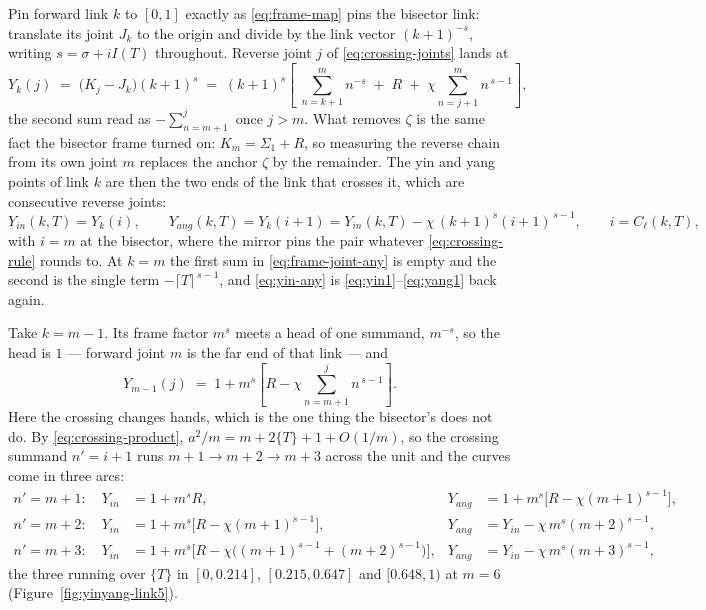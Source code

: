 \documentclass[11pt]{article}
\theoremstyle{definition}
\begin{document}
Pin forward link $k$ to $[0,1]$ exactly as \eqref{eq:frame-map} pins the
bisector link: translate its joint $J_k$ to the origin and divide by the link
vector $(k+1)^{-s}$, writing $s=\sigma+iI(T)$ throughout. Reverse joint $j$ of
\eqref{eq:crossing-joints} lands at
\begin{equation}\label{eq:frame-joint-any}
Y_k(j)\;=\;\bigl(K_j-J_k\bigr)(k+1)^{s}
\;=\;(k+1)^{s}\left[\;\sum_{n=k+1}^{m}n^{-s}\;+\;R\;+\;\chi\!\!\sum_{n=j+1}^{m}\!\!n^{\,s-1}\right],
\end{equation}
the second sum read as $-\sum_{n=m+1}^{j}$ once $j>m$. What removes $\zeta$ is
the same fact the bisector frame turned on: $K_m=\Sigma_1+R$, so measuring the
reverse chain from its own joint $m$ replaces the anchor $\zeta$ by the
remainder. The yin and yang points of link $k$ are then the two ends of the
link that crosses it, which are consecutive reverse joints:
\begin{equation}\label{eq:yin-any}
Y_{in}(k,T)=Y_k(i),
\qquad
Y_{ang}(k,T)=Y_k(i+1)=Y_{in}(k,T)-\chi\,(k+1)^{s}(i+1)^{\,s-1},
\qquad i=C_{\ell}(k,T),
\end{equation}
with $i=m$ at the bisector, where the mirror pins the pair whatever
\eqref{eq:crossing-rule} rounds to. At $k=m$ the first sum in
\eqref{eq:frame-joint-any} is empty and the second is the single term
$-\lceil T\rceil^{\,s-1}$, and \eqref{eq:yin-any} is
\eqref{eq:yin1}--\eqref{eq:yang1} back again.

Take $k=m-1$. Its frame factor $m^{s}$ meets a head of one summand, $m^{-s}$,
so the head is $1$ — forward joint $m$ is the far end of that link — and
\begin{equation}\label{eq:frame-joint-below}
Y_{m-1}(j)\;=\;1+m^{s}\left[R-\chi\!\!\sum_{n=m+1}^{j}\!\!n^{\,s-1}\right].
\end{equation}
Here the crossing changes hands, which is the one thing the bisector's does
not do. By \eqref{eq:crossing-product}, $a^{2}/m=m+2\{T\}+1+O(1/m)$, so the
crossing summand $n'=i+1$ runs $m+1\to m+2\to m+3$ across the unit and the
curves come in three arcs:
\begin{align}
n'=m+1:\quad
Y_{in}&=1+m^{s}R,
&Y_{ang}&=1+m^{s}\bigl[R-\chi(m{+}1)^{s-1}\bigr],
\label{eq:yin-below-a}\\
n'=m+2:\quad
Y_{in}&=1+m^{s}\bigl[R-\chi(m{+}1)^{s-1}\bigr],
&Y_{ang}&=Y_{in}-\chi\,m^{s}(m{+}2)^{s-1},
\label{eq:yin-below-b}\\
n'=m+3:\quad
Y_{in}&=1+m^{s}\bigl[R-\chi\bigl((m{+}1)^{s-1}+(m{+}2)^{s-1}\bigr)\bigr],
&Y_{ang}&=Y_{in}-\chi\,m^{s}(m{+}3)^{s-1},
\label{eq:yin-below-c}
\end{align}
the three running over $\{T\}$ in $[0,0.214]$, $[0.215,0.647]$ and
$[0.648,1)$ at $m=6$ (Figure~\ref{fig:yinyang-link5}).
\end{document}
